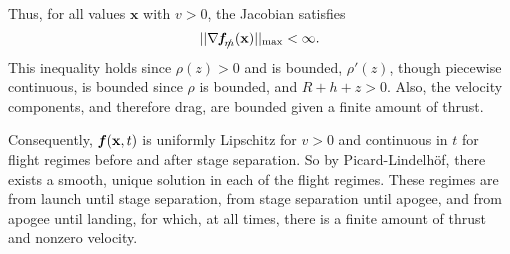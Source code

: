 \documentclass[11pt]{thesis}
\numberwithin{equation}{section}
\begin{document}
Thus, for all values $\mathbf{x}$ with $v > 0$, the Jacobian satisfies
\begin{equation}
||\nabla \textit{\textbf{f}}_{\slashed{m}}(\mathbf{x})||_{\mathrm{max}} < \infty.
\end{equation}
This inequality holds since $\rho(z) > 0$ and is bounded, $\rho'(z)$, though piecewise continuous, is bounded since $\rho$ is bounded, and $R + h + z > 0$. Also, the velocity components, and therefore drag, are bounded given a finite amount of thrust.

Consequently, $\textit{\textbf{f}}\hspace{0.4ex}(\mathbf{x}, t)$ is uniformly Lipschitz for $v > 0$ and continuous in $t$ for flight regimes before and after stage separation. So by Picard-Lindelh{\"o}f, there exists a smooth, unique solution in each of the flight regimes. These regimes are from launch until stage separation, from stage separation until apogee, and from apogee until landing, for which, at all times, there is a finite amount of thrust and nonzero velocity. 

\end{document}
